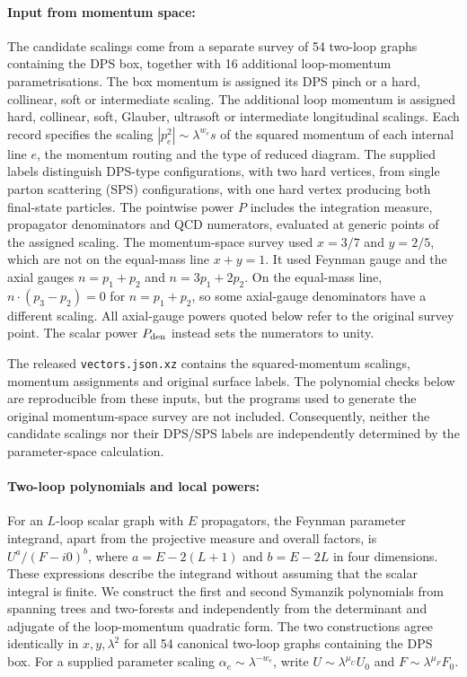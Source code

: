 \paragraph{Input from momentum space: }
The candidate scalings come from a
separate survey of 54 two-loop graphs
containing the DPS box, together with
16 additional loop-momentum
parametrisations.
%
The box momentum is assigned its
DPS pinch or a hard, collinear, soft
or intermediate scaling.
The additional loop momentum is
assigned hard, collinear, soft,
Glauber, ultrasoft or intermediate
longitudinal scalings.
%
Each record specifies the scaling
$|p_e^2|\sim\lambda^{w_e}s$
of the squared momentum of each
internal line $e$, the momentum
routing and the type of reduced
diagram. The supplied labels
distinguish DPS-type configurations,
with two hard vertices, from
single parton scattering (SPS)
configurations, with one hard
vertex producing both final-state
particles.
%
The pointwise power $P$ includes
the integration measure, propagator
denominators and QCD numerators,
evaluated at generic points of the
assigned scaling. The momentum-space survey
used $x=3/7$ and $y=2/5$, which are not on
the equal-mass line $x+y=1$.
It used Feynman gauge and the axial gauges
$n=p_1+p_2$ and $n=3p_1+2p_2$.
On the equal-mass line, $n\cdot(p_3-p_2)=0$
for $n=p_1+p_2$, so some axial-gauge
denominators have a different scaling.
All axial-gauge powers quoted below refer
to the original survey point.
The scalar power $P_{\rm den}$
instead sets the numerators to unity.

The released \texttt{vectors.json.xz}
contains the squared-momentum scalings,
momentum assignments and original
surface labels. The polynomial
checks below are reproducible from
these inputs, but the programs used
to generate the original momentum-space
survey are not included.
Consequently, neither the candidate
scalings nor their DPS/SPS labels
are independently determined by the
parameter-space calculation.

\paragraph{Two-loop polynomials and local powers: }
For an $L$-loop scalar graph with
$E$ propagators, the Feynman parameter
integrand, apart from the projective
measure and overall factors, is
$U^a/(F-i0)^b$, where
$a=E-2(L+1)$ and $b=E-2L$
in four dimensions.
These expressions describe the
integrand without assuming that
the scalar integral is finite.
%
We construct the first and second
Symanzik polynomials from spanning
trees and two-forests and independently
from the determinant and adjugate
of the loop-momentum quadratic form.
The two constructions agree
identically in $x,y,\lambda^2$
for all 54 canonical two-loop
graphs containing the DPS box.
%
For a supplied parameter scaling
$\alpha_e\sim\lambda^{-w_e}$,
write
$U\sim\lambda^{\mu_U}U_0$
and $F\sim\lambda^{\mu_F}F_0$.


